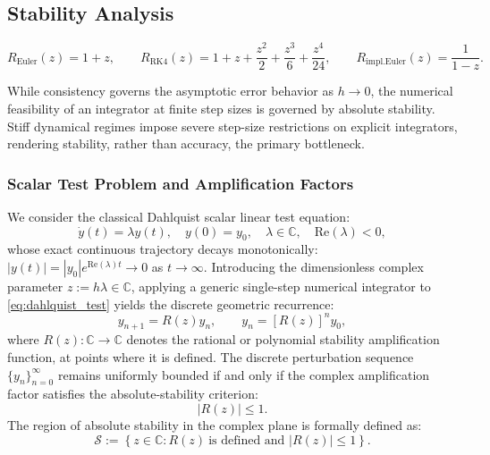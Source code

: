 \documentclass[11pt,a4paper]{article}
\theoremstyle{definition}
\theoremstyle{remark}
\begin{document}
\subsection{Stability Analysis}
\label{sec:stability_analysis}

\begin{equation}
    R_{\text{Euler}}(z) = 1 + z, \qquad
    R_{\text{RK4}}(z) = 1 + z + \frac{z^2}{2} + \frac{z^3}{6} + \frac{z^4}{24},
    \qquad
    R_{\text{impl.Euler}}(z) = \frac{1}{1 - z}.
\end{equation}

While consistency governs the asymptotic error behavior as $h \to 0$, the numerical feasibility of an integrator at finite step sizes is governed by absolute stability. Stiff dynamical regimes impose severe step-size restrictions on explicit integrators, rendering stability, rather than accuracy, the primary bottleneck.

\subsubsection{Scalar Test Problem and Amplification Factors}
We consider the classical Dahlquist scalar linear test equation:
\begin{equation}
\label{eq:dahlquist_test}
\dot{y}(t) = \lambda y(t), \quad y(0) = y_0, \quad \lambda \in \mathbb{C}, \quad \mathrm{Re}(\lambda) < 0,
\end{equation}
whose exact continuous trajectory decays monotonically: $|y(t)| = |y_0| e^{\mathrm{Re}(\lambda)t} \to 0$ as $t \to \infty$. Introducing the dimensionless complex parameter $z := h\lambda \in \mathbb{C}$, applying a generic single-step numerical integrator to \eqref{eq:dahlquist_test} yields the discrete geometric recurrence:
\begin{equation}
\label{eq:discrete_recurrence}
 y_{n+1} = R(z) y_n, \qquad y_n = \left[R(z)\right]^n y_0,
\end{equation}
where $R(z): \mathbb{C} \to \mathbb{C}$ denotes the rational or polynomial stability amplification function, at points where it is defined. The discrete perturbation sequence $\{y_n\}_{n=0}^\infty$ remains uniformly bounded if and only if the complex amplification factor satisfies the absolute-stability criterion:
\begin{equation}
\label{eq:stability_criterion}
|R(z)| \le 1.
\end{equation}
The region of absolute stability in the complex plane is formally defined as:
\begin{equation}
\label{eq:stability_region_def}
\mathcal{S} := \left\{ z \in \mathbb{C} : R(z)\ \text{is defined and } |R(z)| \le 1 \right\}.
\end{equation}
\end{document}
